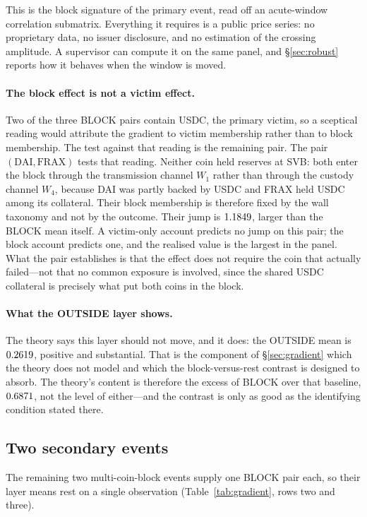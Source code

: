 This is the block signature of the primary event, read off an acute-window correlation submatrix. Everything it requires is a public price series: no proprietary data, no issuer disclosure, and no estimation of the crossing amplitude. A supervisor can compute it on the same panel, and \S\ref{sec:robust} reports how it behaves when the window is moved.

\paragraph{The block effect is not a victim effect.} Two of the three BLOCK pairs contain USDC, the primary victim, so a sceptical reading would attribute the gradient to victim membership rather than to block membership. The test against that reading is the remaining pair. The pair $(\text{DAI},\text{FRAX})$ tests that reading. Neither coin held reserves at SVB: both enter the block through the transmission channel $W_1$ rather than through the custody channel $W_4$, because DAI was partly backed by USDC and FRAX held USDC among its collateral. Their block membership is therefore fixed by the wall taxonomy and not by the outcome. Their jump is $1.1849$, larger than the BLOCK mean itself. A victim-only account predicts no jump on this pair; the block account predicts one, and the realised value is the largest in the panel. What the pair establishes is that the effect does not require the coin that actually failed---not that no common exposure is involved, since the shared USDC collateral is precisely what put both coins in the block.

\paragraph{What the OUTSIDE layer shows.} The theory says this layer should not move, and it does: the OUTSIDE mean is $0.2619$, positive and substantial. That is the component of \S\ref{sec:gradient} which the theory does not model and which the block-versus-rest contrast is designed to absorb. The theory's content is therefore the excess of BLOCK over that baseline, $0.6871$, not the level of either---and the contrast is only as good as the identifying condition stated there.

\subsection{Two secondary events}\label{sec:ftx-fdusd}
The remaining two multi-coin-block events supply one BLOCK pair each, so their layer means rest on a single observation (Table~\ref{tab:gradient}, rows two and three).

